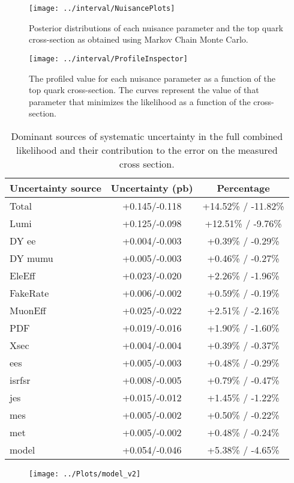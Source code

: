\documentclass[11pt]{article}
\begin{document}
\begin{figure}[htbp]
  \begin{center}
    \texttt{[image: ../interval/NuisancePlots]}
    \caption{Posterior distributions of each nuisance parameter and the top quark cross-section as obtained using Markov Chain Monte Carlo.}
    \end{center}
  \begin{center}
    \texttt{[image: ../interval/ProfileInspector]}
    \caption{The profiled value for each nuisance parameter as a function of the top quark cross-section.  The curves represent the value of that parameter that minimizes the likelihood as a function of the cross-section.}
  \end{center}
\end{figure}
\clearpage
\newpage

\begin{table}[htbp]
  \begin{center}
    \begin{tabular}{|l|c|c|} \hline
      Uncertainty source & Uncertainty (pb) & Percentage \\
      \hline
      \hline
      Total & +0.145/-0.118 & +14.52\% / -11.82\% \\
      \hline
      Lumi &  +0.125/-0.098 & +12.51\% / -9.76\% \\
      DY ee &  +0.004/-0.003 & +0.39\% / -0.29\% \\
      DY mumu & +0.005/-0.003 & +0.46\% / -0.27\% \\
      EleEff &  +0.023/-0.020 & +2.26\% / -1.96\% \\
      FakeRate & +0.006/-0.002 & +0.59\% / -0.19\% \\
      MuonEff & +0.025/-0.022 & +2.51\% / -2.16\% \\
      PDF & +0.019/-0.016 & +1.90\% / -1.60\% \\
      Xsec & +0.004/-0.004 & +0.39\% / -0.37\% \\
      ees & +0.005/-0.003 & +0.48\% / -0.29\% \\
      isrfsr & +0.008/-0.005 & +0.79\% / -0.47\% \\
      jes & +0.015/-0.012 & +1.45\% / -1.22\% \\
      mes & +0.005/-0.002 & +0.50\% / -0.22\% \\
      met & +0.005/-0.002 & +0.48\% / -0.24\% \\
      model &  +0.054/-0.046 & +5.38\% / -4.65\% \\
      \hline
    \end{tabular}
  \end{center}
  \caption{\label{tab:importantSystematics}
    Dominant sources of systematic uncertainty in the full combined likelihood 
    and their contribution to the error on the measured cross section.
  }
\end{table}





\begin{figure}[htbp]
  \begin{center}
    \texttt{[image: ../Plots/model\_v2]}
  \end{center}
\end{figure}
\clearpage
\newpage
    
\end{document}
